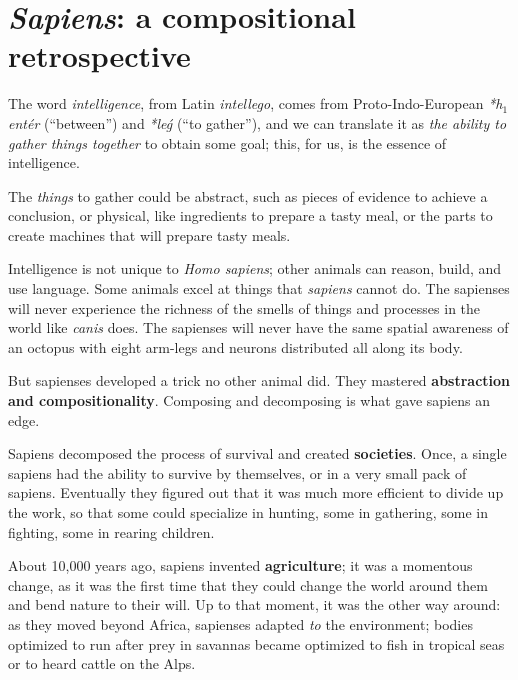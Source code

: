
\section[Sapiens: a retrospective]{\emph{Sapiens}: a compositional retrospective}

\label{sec:brief-history}

The word \emph{intelligence}, from Latin \emph{intellego}, comes from Proto-Indo-European  \emph{*h${}_1$entér} (``between'') and \emph{*leǵ} (``to gather''), and we can translate it as \emph{the ability to gather things together} to obtain some goal;
this, for us, is the essence of intelligence.

The \emph{things} to gather could be abstract, such as pieces of evidence to achieve a conclusion, or physical, like ingredients to prepare a tasty meal, or the parts to create machines that will prepare tasty meals.

Intelligence is not unique to \emph{Homo sapiens}; other animals can reason, build, and use language.
Some animals excel at things that \emph{sapiens} cannot do.
The sapienses will never experience the richness of the smells of things and processes in the world like \emph{canis} does.
The sapienses will never have the same spatial awareness of an octopus with eight arm-legs and neurons distributed all along its body.

But sapienses developed a trick no other animal did.
They mastered \textbf{abstraction and compositionality}.
Composing and decomposing is what gave sapiens an edge.


Sapiens decomposed the process of survival and created \textbf{societies}.
Once, a single sapiens had the ability to survive by themselves, or in a very small pack of sapiens.
Eventually they figured out that it was much more efficient to divide up the work, so that some could specialize in hunting, some in gathering, some in fighting, some in rearing children.

About 10,000 years ago, sapiens invented \textbf{agriculture}; it was a momentous change, as it was the first time that they could change the world around them and bend nature to their will.
Up to that moment, it was the other way around: as they moved beyond Africa, sapienses adapted \emph{to} the environment;
bodies optimized to run after prey in savannas became optimized to fish in tropical seas or to heard cattle on the Alps.

